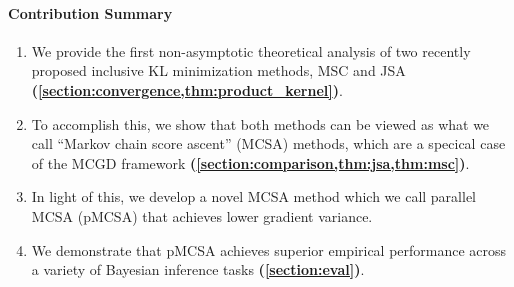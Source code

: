 \vspace{-0.1in}
\paragraph{Contribution Summary}
\setlength\itemsep{0.01in}
\begin{enumerate}[leftmargin=7mm,listparindent=\parindent]
    \item We provide the first non-asymptotic theoretical analysis of two recently proposed inclusive KL minimization methods, MSC and JSA \textbf{(\cref{section:convergence,thm:product_kernel})}.
    \item To accomplish this, we show that both methods can be viewed as what we call ``Markov chain score ascent'' (MCSA) methods, which are a specical case of the MCGD framework \textbf{(\cref{section:comparison,thm:jsa,thm:msc})}.
    \item In light of this, we develop a novel MCSA method which we call parallel MCSA (pMCSA) that achieves lower gradient variance.
    \item We demonstrate that pMCSA achieves superior empirical performance across a variety of Bayesian inference tasks \textbf{(\cref{section:eval})}.
\end{enumerate}

